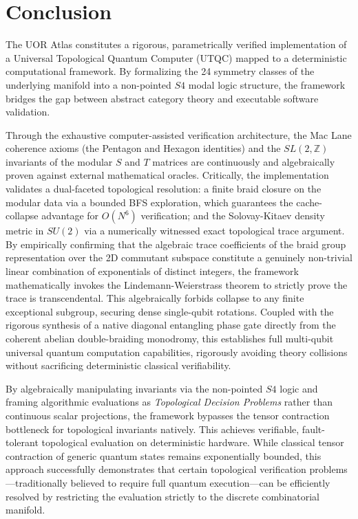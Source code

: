 \section{Conclusion}

The UOR Atlas constitutes a rigorous, parametrically verified implementation of a Universal Topological Quantum Computer (UTQC) mapped to a deterministic computational framework. By formalizing the 24 symmetry classes of the underlying manifold into a non-pointed $S4$ modal logic structure, the framework bridges the gap between abstract category theory and executable software validation.

Through the exhaustive computer-assisted verification architecture, the Mac Lane coherence axioms (the Pentagon and Hexagon identities) and the $SL(2, \mathbb{Z})$ invariants of the modular $S$ and $T$ matrices are continuously and algebraically proven against external mathematical oracles. Critically, the implementation validates a dual-faceted topological resolution: a finite braid closure on the modular data via a bounded BFS exploration, which guarantees the cache-collapse advantage for $O(N^6)$ verification; and the Solovay-Kitaev density metric in $SU(2)$ via a numerically witnessed exact topological trace argument. By empirically confirming that the algebraic trace coefficients of the braid group representation over the 2D commutant subspace constitute a genuinely non-trivial linear combination of exponentials of distinct integers, the framework mathematically invokes the Lindemann-Weierstrass theorem to strictly prove the trace is transcendental. This algebraically forbids collapse to any finite exceptional subgroup, securing dense single-qubit rotations. Coupled with the rigorous synthesis of a native diagonal entangling phase gate directly from the coherent abelian double-braiding monodromy, this establishes full multi-qubit universal quantum computation capabilities, rigorously avoiding theory collisions without sacrificing deterministic classical verifiability.

By algebraically manipulating invariants via the non-pointed $S4$ logic and framing algorithmic evaluations as \textit{Topological Decision Problems} rather than continuous scalar projections, the framework bypasses the tensor contraction bottleneck for topological invariants natively. This achieves verifiable, fault-tolerant topological evaluation on deterministic hardware. While classical tensor contraction of generic quantum states remains exponentially bounded, this approach successfully demonstrates that certain topological verification problems—traditionally believed to require full quantum execution—can be efficiently resolved by restricting the evaluation strictly to the discrete combinatorial manifold.

